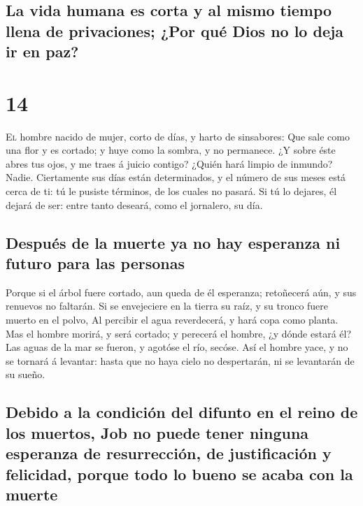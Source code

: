 \hypertarget{la-vida-humana-es-corta-y-al-mismo-tiempo-llena-de-privaciones-por-quuxe9-dios-no-lo-deja-ir-en-paz}{%
\subsection{La vida humana es corta y al mismo tiempo llena de
privaciones; ¿Por qué Dios no lo deja ir en
paz?}\label{la-vida-humana-es-corta-y-al-mismo-tiempo-llena-de-privaciones-por-quuxe9-dios-no-lo-deja-ir-en-paz}}

\hypertarget{section-18-14}{%
\section{14}\label{section-18-14}}

 \textsc{El} hombre nacido de mujer, corto de días, y
harto de sinsabores:  Que sale como una flor y es cortado;
y huye como la sombra, y no permanece.  ¿Y sobre éste
abres tus ojos, y me traes á juicio contigo?  ¿Quién hará
limpio de inmundo? Nadie.  Ciertamente sus días están
determinados, y el número de sus meses está cerca de ti: tú le pusiste
términos, de los cuales no pasará.  Si tú lo dejares, él
dejará de ser: entre tanto deseará, como el jornalero, su día.

\hypertarget{despuuxe9s-de-la-muerte-ya-no-hay-esperanza-ni-futuro-para-las-personas}{%
\subsection{Después de la muerte ya no hay esperanza ni futuro para las
personas}\label{despuuxe9s-de-la-muerte-ya-no-hay-esperanza-ni-futuro-para-las-personas}}

 Porque si el árbol fuere cortado, aun queda de él
esperanza; retoñecerá aún, y sus renuevos no faltarán.  Si
se envejeciere en la tierra su raíz, y su tronco fuere muerto en el
polvo,  Al percibir el agua reverdecerá, y hará copa como
planta.  Mas el hombre morirá, y será cortado; y perecerá
el hombre, ¿y dónde estará él?  Las aguas de la mar se
fueron, y agotóse el río, secóse.  Así el hombre yace, y
no se tornará á levantar: hasta que no haya cielo no despertarán, ni se
levantarán de su sueño.

\hypertarget{debido-a-la-condiciuxf3n-del-difunto-en-el-reino-de-los-muertos-job-no-puede-tener-ninguna-esperanza-de-resurrecciuxf3n-de-justificaciuxf3n-y-felicidad-porque-todo-lo-bueno-se-acaba-con-la-muerte}{%
\subsection{Debido a la condición del difunto en el reino de los
muertos, Job no puede tener ninguna esperanza de resurrección, de
justificación y felicidad, porque todo lo bueno se acaba con la
muerte}\label{debido-a-la-condiciuxf3n-del-difunto-en-el-reino-de-los-muertos-job-no-puede-tener-ninguna-esperanza-de-resurrecciuxf3n-de-justificaciuxf3n-y-felicidad-porque-todo-lo-bueno-se-acaba-con-la-muerte}}

